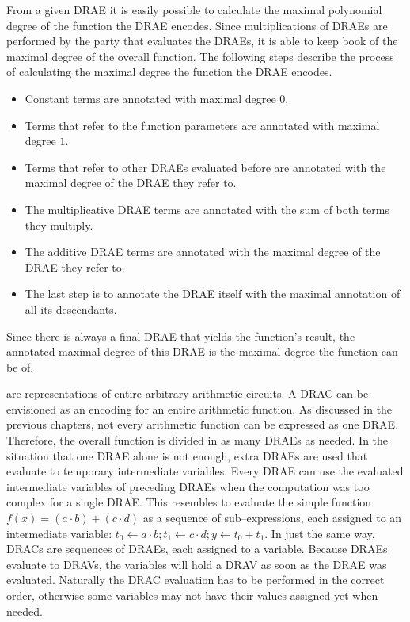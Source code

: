 \label{sec:max-poly-degree}

From a given DRAE it is easily possible to calculate the maximal polynomial
degree of the function the DRAE encodes. Since multiplications of DRAEs are
performed by the party that evaluates the DRAEs, it is able to keep book of the
maximal degree of the overall function. The following steps describe the process
of calculating the maximal degree the function the DRAE encodes.

\begin{itemize}

  \item Constant terms are annotated with maximal degree $0$.

  \item Terms that refer to the function parameters are annotated with maximal
    degree $1$.

  \item Terms that refer to other DRAEs evaluated before are annotated with the
    maximal degree of the DRAE they refer to.

  \item The multiplicative DRAE terms are annotated with the sum of both terms
    they multiply.

  \item The additive DRAE terms are annotated with the maximal degree of the
    DRAE they refer to.

  \item The last step is to annotate the DRAE itself with the maximal annotation
    of all its descendants.

\end{itemize}

Since there is always a final DRAE that yields the function's result, the
annotated maximal degree of this DRAE is the maximal degree the function can be
of.


%
%
\label{sec:drac}

 are representations of entire
arbitrary arithmetic circuits. A DRAC can be envisioned as an encoding for an
entire arithmetic function. As discussed in the previous chapters, not every
arithmetic function can be expressed as one DRAE\@. Therefore, the overall
function is divided in as many DRAEs as needed. In the situation that one DRAE
alone is not enough, extra DRAEs are used that evaluate to temporary
intermediate variables. Every DRAE can use the evaluated intermediate variables
of preceding DRAEs when the computation was too complex for a single DRAE\@.
This resembles to evaluate the simple function $f(x) = (a \cdot b) + (c \cdot
d)$ as a sequence of sub--expressions, each assigned to an intermediate
variable: $t_0 \leftarrow a \cdot b; t_1 \leftarrow c \cdot d; y \leftarrow t_0
+ t_1$.  In just the same way, DRACs are sequences of DRAEs, each assigned to a
variable.  Because DRAEs evaluate to DRAVs, the variables will hold a DRAV as
soon as the DRAE was evaluated. Naturally the DRAC evaluation has to be
performed in the correct order, otherwise some variables may not have their
values assigned yet when needed.


